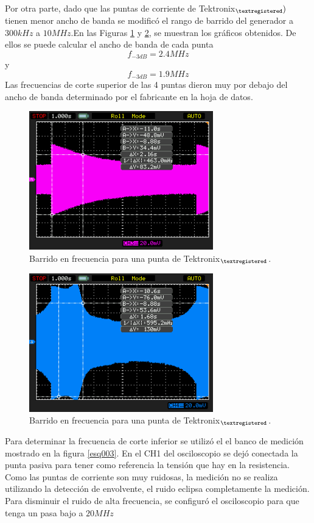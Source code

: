 \documentclass[a4paper,10pt]{article}
\begin{document}
		\indent Por otra parte, dado que las puntas de corriente de 
		Tektronix$_{\textregistered} )$ tienen menor ancho de banda se 
		modific\'o el rango de barrido del generador a $300kHz$ a $10MHz$.En 
		las Figuras \ref{img006} y \ref{img007}, se muestran los gr\'aficos 
		obtenidos. De ellos se puede calcular el ancho de banda de cada punta
		$$f_{-3dB}=2.4MHz$$ y $$f_{-3dB}=1.9MHz$$
		\indent Las frecuencias de corte superior de las 4 puntas dieron muy 
		por debajo del ancho de banda determinado por el fabricante en la hoja 
		de datos.
		
		\begin{figure}[!htb]
			\centering
			\includegraphics[width=8cm]
			{Imagenes/Mediciones instrumentos/NewFile7.png}
			\caption{Barrido en frecuencia para una punta de 
			Tektronix$_{\textregistered}$.} \label{img006}
		\end{figure}		
	
		\begin{figure}[!htb]
			\centering
			\includegraphics[width=8cm]
			{Imagenes/Mediciones instrumentos/NewFile8.png}
			\caption{Barrido en frecuencia para una punta de 
			Tektronix$_{\textregistered}$.} \label{img007}
		\end{figure}
	
		\indent Para determinar la frecuencia de corte inferior se utilizó el
		el banco de medición mostrado en la figura \ref{esq003}. En el CH1 del
		osciloscopio se dejó conectada la punta pasiva para tener como 
		referencia la tensión que hay en la resistencia. \\
		\indent Como las puntas de corriente son muy ruidosas, la medición no
		se realiza utilizando la detección de envolvente, el ruido eclipsa 
		completamente la medición. Para disminuir el ruido de alta frecuencia,
		se configuró el osciloscopio para que tenga un pasa bajo a $20 MHz$\\
\end{document}
